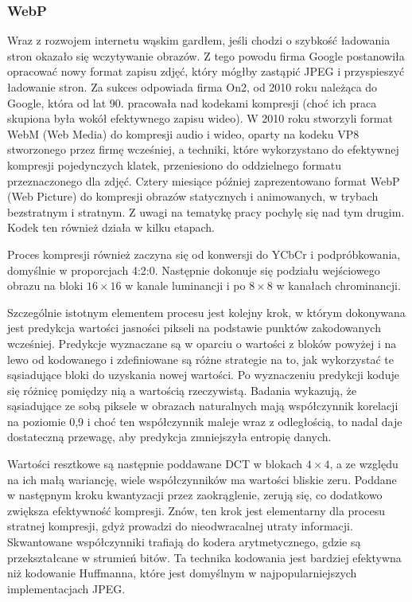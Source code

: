 \subsubsection{WebP} \label{webp}

Wraz z rozwojem internetu wąskim gardłem, jeśli chodzi o szybkość ładowania stron okazało się wczytywanie obrazów. Z tego powodu firma Google postanowiła opracować nowy format zapisu zdjęć, który mógłby zastąpić JPEG i przyspieszyć ładowanie stron. Za sukces odpowiada firma On2, od 2010 roku należąca do Google, która od lat 90. pracowała nad kodekami kompresji (choć ich praca skupiona była wokół efektywnego zapisu wideo). W 2010 roku stworzyli format WebM (Web Media) do kompresji audio i wideo, oparty na kodeku VP8 stworzonego przez firmę wcześniej, a techniki, które wykorzystano do efektywnej kompresji pojedynczych klatek, przeniesiono do oddzielnego formatu przeznaczonego dla zdjęć. Cztery miesiące później zaprezentowano format WebP (Web Picture) do kompresji obrazów statycznych i animowanych, w trybach bezstratnym i stratnym. Z uwagi na tematykę pracy pochylę się nad tym drugim. Kodek ten również działa w kilku etapach.

\begin{sloppypar}
Proces kompresji również zaczyna się od konwersji do YCbCr i podpróbkowania, domyślnie w proporcjach 4:2:0. Następnie dokonuje się podziału wejściowego obrazu na bloki \(16\times16\) w kanale luminancji i po \(8\times8\) w kanałach chrominancji.
\end{sloppypar}
	
Szczególnie istotnym elementem procesu jest kolejny krok, w którym dokonywana jest predykcja wartości jasności pikseli na podstawie punktów zakodowanych wcześniej. Predykcje wyznaczane są w oparciu o wartości z bloków powyżej i na lewo od kodowanego i zdefiniowane są różne strategie na to, jak wykorzystać te sąsiadujące bloki do uzyskania nowej wartości. Po wyznaczeniu predykcji koduje się różnicę pomiędzy nią a wartością rzeczywistą. Badania wykazują, że sąsiadujące ze sobą piksele w obrazach naturalnych mają współczynnik korelacji na poziomie 0,9\cite{imagestatistics} i choć ten współczynnik maleje wraz z odległością, to nadal daje dostateczną przewagę, aby predykcja zmniejszyła entropię danych.

Wartości resztkowe są następnie poddawane DCT w blokach \( 4 \times 4 \), a ze względu na ich małą wariancję, wiele współczynników ma wartości bliskie zeru. Poddane w następnym kroku kwantyzacji przez zaokrąglenie, zerują się, co dodatkowo zwiększa efektywność kompresji. Znów, ten krok jest elementarny dla procesu stratnej kompresji, gdyż prowadzi do nieodwracalnej utraty informacji. Skwantowane współczynniki trafiają do kodera arytmetycznego, gdzie są przekształcane w strumień bitów. Ta technika kodowania jest bardziej efektywna niż kodowanie Huffmanna, które jest domyślnym w najpopularniejszych implementacjach JPEG.

